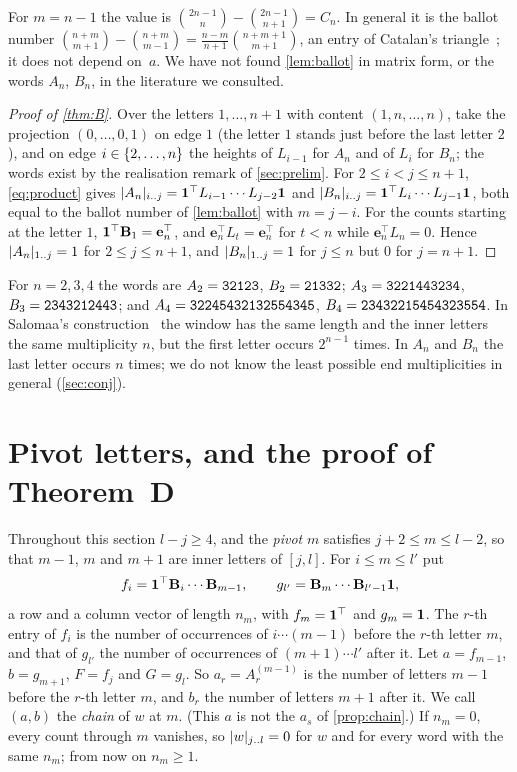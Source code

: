\documentclass[11pt,a4paper]{article}
\newcommand{\Lt}[1]{L_{#1}}
\newcommand{\ee}[1]{\mathbf{e}_{#1}}
\begin{document}
For $m=n-1$ the value is $\binom{2n-1}{n}-\binom{2n-1}{n+1}=C_n$. In general it is the ballot number $\binom{n+m}{m+1}-\binom{n+m}{m-1}=\frac{n-m}{n+1}\binom{n+m+1}{m+1}$, an entry of Catalan's triangle~\cite[A009766]{OEIS}; it does not depend on~$a$. We have not found \cref{lem:ballot} in matrix form, or the words $A_n$, $B_n$, in the literature we consulted.

\begin{proof}[Proof of \cref{thm:B}]
Over the letters $1,\dots,n+1$ with content $(1,n,\dots,n)$, take the projection $(0,\dots,0,1)$ on edge $1$ (the letter $1$ stands just before the last letter $2$), and on edge $i\in\{2,\ldots,n\}$ the heights of $\Lt{i-1}$ for $A_n$ and of $\Lt{i}$ for $B_n$; the words exist by the realisation remark of \cref{sec:prelim}. For $2\le i<j\le n+1$, \eqref{eq:product} gives $\cntof{A_n}{i\upto j}=\one^{\top}\Lt{i-1}\cdots\Lt{j-2}\one$ and $\cntof{B_n}{i\upto j}=\one^{\top}\Lt{i}\cdots\Lt{j-1}\one$, both equal to the ballot number of \cref{lem:ballot} with $m=j-i$. For the counts starting at the letter $1$, $\one^{\top}\Bmat{1}=\ee{n}^{\top}$, and $\ee{n}^{\top}\Lt{t}=\ee{n}^{\top}$ for $t<n$ while $\ee{n}^{\top}\Lt{n}=0$. Hence $\lvert A_n\rvert_{1\mathinner{\ldotp\ldotp} j}=1$ for $2\le j\le n+1$, and $\lvert B_n\rvert_{1\mathinner{\ldotp\ldotp} j}=1$ for $j\le n$ but $0$ for $j=n+1$.
\end{proof}

For $n=2,3,4$ the words are $A_2=\mathtt{32123}$, $B_2=\mathtt{21332}$; $A_3=\mathtt{3221443234}$, $B_3=\mathtt{2343212443}$; and $A_4=\mathtt{32245432132554345}$, $B_4=\mathtt{23432215454323554}$. In Salomaa's construction~\cite[Theorem~4]{Sal06} the window has the same length and the inner letters the same multiplicity $n$, but the first letter occurs $2^{n-1}$ times. In $A_n$ and $B_n$ the last letter occurs $n$ times; we do not know the least possible end multiplicities in general (\cref{sec:conj}).

\section{Pivot letters, and the proof of Theorem~D}\label{sec:pivot}

Throughout this section $l-j\ge4$, and the \emph{pivot} $m$ satisfies $j+2\le m\le l-2$, so that $m-1$, $m$ and $m+1$ are inner letters of $[j,l]$. For $i\le m\le l'$ put
\[
f_i=\mathbf{1}^{\top}\mathbf{B}_{i}\cdots\mathbf{B}_{m-1},\qquad g_{l'}=\mathbf{B}_{m}\cdots\mathbf{B}_{l'-1}\mathbf{1},
\]
a row and a column vector of length $n_m$, with $f_m=\mathbf{1}^{\top}$ and $g_m=\mathbf{1}$. The $r$-th entry of $f_i$ is the number of occurrences of $i\cdots(m-1)$ before the $r$-th letter $m$, and that of $g_{l'}$ the number of occurrences of $(m+1)\cdots l'$ after it. Let $a=f_{m-1}$, $b=g_{m+1}$, $F=f_j$ and $G=g_l$. So $a_r=A^{(m-1)}_r$ is the number of letters $m-1$ before the $r$-th letter $m$, and $b_r$ the number of letters $m+1$ after it. We call $(a,b)$ the \emph{chain} of $w$ at $m$. (This $a$ is not the $a_s$ of \cref{prop:chain}.) If $n_m=0$, every count through $m$ vanishes, so $\lvert w\rvert_{j\mathinner{\ldotp\ldotp} l}=0$ for $w$ and for every word with the same $n_m$; from now on $n_m\ge1$.
\end{document}
